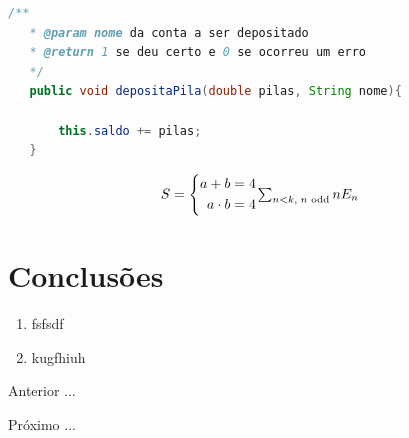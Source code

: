 \begin{lstlisting}[language=Java, caption=depositoPilas, label=depositaPilas]
    /**
   * @param nome da conta a ser depositado
   * @return 1 se deu certo e 0 se ocorreu um erro
   */
   public void depositaPila(double pilas, String nome){

       this.saldo += pilas;
   }
\end{lstlisting}








\begin{equation}
S = \left\{
\begin{aligned}
  a + b     &= 4\\
  a \cdot b &= 4
\end{aligned}
\right.
$$ $$%
\sum_{n<k,\;\text{$n$ odd}} nE_n
 \label{1}
\end{equation}


\section{Conclusões}


\begin{enumerate}[label=\Roman{*}, ref=(\roman{*})]
  \item fsfsdf
  \item kugfhiuh
\end{enumerate}

\begin{asparaenum}
\item Anterior ... \cite{ninguem2022curioso}
\item Próximo ... \label{pl1}
\end{asparaenum}









